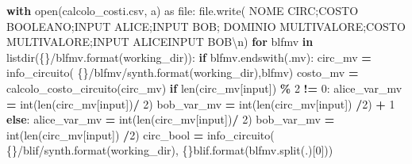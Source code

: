 \documentclass[
]{book}
\newenvironment{Shaded}{\begin{snugshade}}{\end{snugshade}}
\newcommand{\BuiltInTok}[1]{#1}
\newcommand{\CharTok}[1]{\textcolor[rgb]{0.31,0.60,0.02}{#1}}
\newcommand{\ControlFlowTok}[1]{\textcolor[rgb]{0.13,0.29,0.53}{\textbf{#1}}}
\newcommand{\DecValTok}[1]{\textcolor[rgb]{0.00,0.00,0.81}{#1}}
\newcommand{\ImportTok}[1]{#1}
\newcommand{\KeywordTok}[1]{\textcolor[rgb]{0.13,0.29,0.53}{\textbf{#1}}}
\newcommand{\NormalTok}[1]{#1}
\newcommand{\OperatorTok}[1]{\textcolor[rgb]{0.81,0.36,0.00}{\textbf{#1}}}
\newcommand{\SpecialCharTok}[1]{\textcolor[rgb]{0.00,0.00,0.00}{#1}}
\newcommand{\StringTok}[1]{\textcolor[rgb]{0.31,0.60,0.02}{#1}}
\begin{document}
\begin{Shaded}
\begin{Highlighting}[]
\ControlFlowTok{with} \BuiltInTok{open}\NormalTok{(}\StringTok{\textquotesingle{}calcolo\_costi.csv\textquotesingle{}}\NormalTok{, }\StringTok{\textquotesingle{}a\textquotesingle{}}\NormalTok{) }\ImportTok{as} \BuiltInTok{file}\NormalTok{:}
  \BuiltInTok{file}\NormalTok{.write(}
    \StringTok{\textquotesingle{}NOME CIRC;COSTO BOOLEANO;INPUT ALICE;INPUT BOB;}
\StringTok{    DOMINIO MULTIVALORE;COSTO MULTIVALORE;INPUT ALICEINPUT BOB}\CharTok{\textbackslash{}n}\StringTok{\textquotesingle{}}\NormalTok{)}
  \ControlFlowTok{for}\NormalTok{ blfmv }\KeywordTok{in}\NormalTok{ listdir(}\StringTok{\textquotesingle{}}\SpecialCharTok{\{\}}\StringTok{/blfmv\textquotesingle{}}\NormalTok{.}\BuiltInTok{format}\NormalTok{(working\_dir)):}
    \ControlFlowTok{if}\NormalTok{ blfmv.endswith(}\StringTok{\textquotesingle{}.mv\textquotesingle{}}\NormalTok{):}
\NormalTok{      circ\_mv }\OperatorTok{=}\NormalTok{ info\_circuito(}
          \StringTok{\textquotesingle{}}\SpecialCharTok{\{\}}\StringTok{/blfmv/synth\textquotesingle{}}\NormalTok{.}\BuiltInTok{format}\NormalTok{(working\_dir),blfmv)}
\NormalTok{      costo\_mv }\OperatorTok{=}\NormalTok{ calcolo\_costo\_circuito(circ\_mv)}
      \ControlFlowTok{if} \BuiltInTok{len}\NormalTok{(circ\_mv[}\StringTok{\textquotesingle{}input\textquotesingle{}}\NormalTok{]) }\OperatorTok{\%} \DecValTok{2} \OperatorTok{!=} \DecValTok{0}\NormalTok{:}
\NormalTok{          alice\_var\_mv }\OperatorTok{=} \BuiltInTok{int}\NormalTok{(}\BuiltInTok{len}\NormalTok{(circ\_mv[}\StringTok{\textquotesingle{}input\textquotesingle{}}\NormalTok{])}\OperatorTok{/} \DecValTok{2}\NormalTok{)}
\NormalTok{          bob\_var\_mv }\OperatorTok{=} \BuiltInTok{int}\NormalTok{(}\BuiltInTok{len}\NormalTok{(circ\_mv[}\StringTok{\textquotesingle{}input\textquotesingle{}}\NormalTok{]) }\OperatorTok{/}\DecValTok{2}\NormalTok{) }\OperatorTok{+} \DecValTok{1}
      \ControlFlowTok{else}\NormalTok{:}
\NormalTok{          alice\_var\_mv }\OperatorTok{=} \BuiltInTok{int}\NormalTok{(}\BuiltInTok{len}\NormalTok{(circ\_mv[}\StringTok{\textquotesingle{}input\textquotesingle{}}\NormalTok{])}\OperatorTok{/} \DecValTok{2}\NormalTok{)}
\NormalTok{          bob\_var\_mv }\OperatorTok{=} \BuiltInTok{int}\NormalTok{(}\BuiltInTok{len}\NormalTok{(circ\_mv[}\StringTok{\textquotesingle{}input\textquotesingle{}}\NormalTok{]) }\OperatorTok{/}\DecValTok{2}\NormalTok{)}
\NormalTok{      circ\_bool }\OperatorTok{=}\NormalTok{ info\_circuito(}
          \StringTok{\textquotesingle{}}\SpecialCharTok{\{\}}\StringTok{/blif/synth\textquotesingle{}}\NormalTok{.}\BuiltInTok{format}\NormalTok{(working\_dir), }\StringTok{\textquotesingle{}}\SpecialCharTok{\{\}}\StringTok{blif\textquotesingle{}}\NormalTok{.}\BuiltInTok{format}\NormalTok{(blfmv.split(}\StringTok{\textquotesingle{}.\textquotesingle{}}\NormalTok{)[}\DecValTok{0}\NormalTok{]))}

\end{Highlighting}
\end{Shaded}
\end{document}
